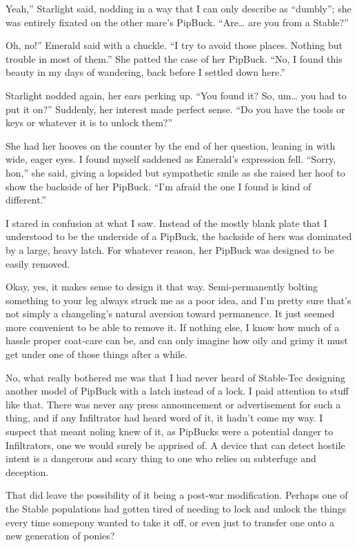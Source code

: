 \leavevmode{}Yeah,” Starlight said, nodding in a way that I can only describe as “dumbly”; she was entirely fixated on the other mare’s PipBuck. “Are… are you from a Stable?”

\leavevmode{}Oh, no!” Emerald said with a chuckle. “I try to avoid those places. Nothing but trouble in most of them.” She patted the case of her PipBuck. “No, I found this beauty in my days of wandering, back before I settled down here.”

Starlight nodded again, her ears perking up. “You found it? So, um… you had to put it on?” Suddenly, her interest made perfect sense. “Do you have the tools or keys or whatever it is to unlock them?”

She had her hooves on the counter by the end of her question, leaning in with wide, eager eyes. I found myself saddened as Emerald’s expression fell. “Sorry, hon,” she said, giving a lopsided but sympathetic smile as she raised her hoof to show the backside of her PipBuck. “I’m afraid the one I found is kind of different.”

I stared in confusion at what I saw. Instead of the mostly blank plate that I understood to be the underside of a PipBuck, the backside of hers was dominated by a large, heavy latch. For whatever reason, her PipBuck was designed to be easily removed.

Okay, yes, it makes sense to design it that way. Semi-permanently bolting something to your leg always struck me as a poor idea, and I’m pretty sure that’s not simply a changeling’s natural aversion toward permanence. It just seemed more convenient to be able to remove it. If nothing else, I know how much of a hassle proper coat-care can be, and can only imagine how oily and grimy it must get under one of those things after a while.

No, what really bothered me was that I had never heard of Stable-Tec designing another model of PipBuck with a latch instead of a lock. I paid attention to stuff like that. There was never any press announcement or advertisement for such a thing, and if any Infiltrator had heard word of it, it hadn’t come my way. I suspect that meant noling knew of it, as PipBucks were a potential danger to Infiltrators, one we would surely be apprised of. A device that can detect hostile intent is a dangerous and scary thing to one who relies on subterfuge and deception.

That did leave the possibility of it being a post-war modification. Perhaps one of the Stable populations had gotten tired of needing to lock and unlock the things every time somepony wanted to take it off, or even just to transfer one onto a new generation of ponies?

